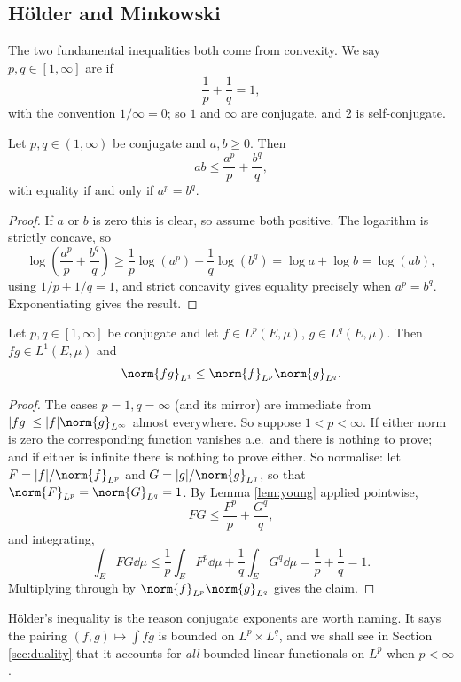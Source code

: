 \documentclass[a4paper]{scrartcl}
\begin{document}
\subsection{H\"older and Minkowski}

The two fundamental inequalities both come from convexity. We say $p, q \in [1,\infty]$ are  if
$$\frac{1}{p} + \frac{1}{q} = 1,$$
with the convention $1/\infty = 0$; so $1$ and $\infty$ are conjugate, and $2$ is self-conjugate.

\begin{lemma}\label{lem:young}
	Let $p, q \in (1,\infty)$ be conjugate and $a, b \ge 0$. Then
	$$ab \le \frac{a^p}{p} + \frac{b^q}{q},$$
	with equality if and only if $a^p = b^q$.
\end{lemma}

\begin{proof}
	If $a$ or $b$ is zero this is clear, so assume both positive. The logarithm is strictly concave, so
	$$\log\left( \frac{a^p}{p} + \frac{b^q}{q} \right) \ge \frac{1}{p} \log(a^p) + \frac{1}{q} \log (b^q) = \log a + \log b = \log(ab),$$
	using $1/p + 1/q = 1$, and strict concavity gives equality precisely when $a^p = b^q$. Exponentiating gives the result.
\end{proof}

\begin{theorem}\label{thm:holder}
	Let $p, q \in [1,\infty]$ be conjugate and let $f \in L^p(E,\mu)$, $g \in L^q(E,\mu)$. Then $fg \in L^1(E,\mu)$ and
	$$\norm{fg}_{L^1} \le \norm{f}_{L^p} \norm{g}_{L^q}.$$
\end{theorem}

\begin{proof}
	The cases $p = 1, q= \infty$ (and its mirror) are immediate from $|fg| \le |f| \norm{g}_{L^\infty}$ almost everywhere. So suppose $1 < p < \infty$. If either norm is zero the corresponding function vanishes a.e.\ and there is nothing to prove; and if either is infinite there is nothing to prove either. So normalise: let $F = |f| / \norm{f}_{L^p}$ and $G = |g|/\norm{g}_{L^q}$, so that $\norm{F}_{L^p} = \norm{G}_{L^q} = 1$. By Lemma \ref{lem:young} applied pointwise,
	$$FG \le \frac{F^p}{p} + \frac{G^q}{q},$$
	and integrating,
	$$\int_E FG \dd\mu \le \frac{1}{p}\int_E F^p \dd \mu + \frac 1q \int_E G^q \dd\mu = \frac 1p + \frac 1q = 1.$$
	Multiplying through by $\norm{f}_{L^p}\norm{g}_{L^q}$ gives the claim.
\end{proof}

H\"older's inequality is the reason conjugate exponents are worth naming. It says the pairing $(f,g) \mapsto \int fg$ is bounded on $L^p \times L^q$, and we shall see in Section \ref{sec:duality} that it accounts for \emph{all} bounded linear functionals on $L^p$ when $p < \infty$.
\end{document}
